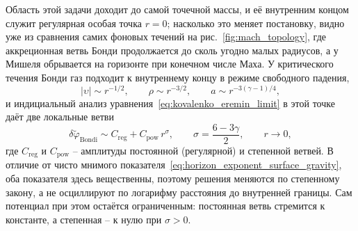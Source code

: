 \documentclass[12pt,a4paper,preprint,nopreprintline]{elsarticle}
\begin{document}
Область этой задачи доходит до самой точечной массы, и её внутренним концом служит регулярная особая точка $r=0$; насколько это меняет постановку, видно уже из сравнения самих фоновых течений на рис.~\ref{fig:mach_topology}, где аккреционная ветвь Бонди продолжается до сколь угодно малых радиусов, а у Мишеля обрывается на горизонте при конечном числе Маха. У критического течения Бонди газ подходит к внутреннему концу в режиме свободного падения,
\begin{equation}
    |\upsilon|\sim r^{-1/2},
    \qquad
    \rho\sim r^{-3/2},
    \qquad
    a\sim r^{-3(\gamma-1)/4},
    \label{eq:bondi_freefall_asymptotics}
\end{equation}
и индициальный анализ уравнения~\eqref{eq:kovalenko_eremin_limit} в этой точке даёт две локальные ветви~\cite{KovalenkoIG_EreminMA_SpatialInstabilityOfSphericalAccretion_1998}
\begin{equation}
    \delta\widetilde{\varphi}_{\mathrm{Bondi}}
    \sim
    C_{\mathrm{reg}}+C_{\mathrm{pow}}\,r^{\sigma},
    \qquad
    \sigma=\frac{6-3\gamma}{2},
    \qquad
    r\rightarrow0,
    \label{eq:bondi_local_branches}
\end{equation}
где $C_{\mathrm{reg}}$ и $C_{\mathrm{pow}}$ -- амплитуды постоянной (регулярной) и степенной ветвей. В отличие от чисто мнимого показателя~\eqref{eq:horizon_exponent_surface_gravity}, оба показателя здесь вещественны, поэтому решения меняются по степенному закону, а не осциллируют по логарифму расстояния до внутренней границы. Сам потенциал при этом остаётся ограниченным: постоянная ветвь стремится к константе, а степенная -- к нулю при $\sigma>0$.
\end{document}
